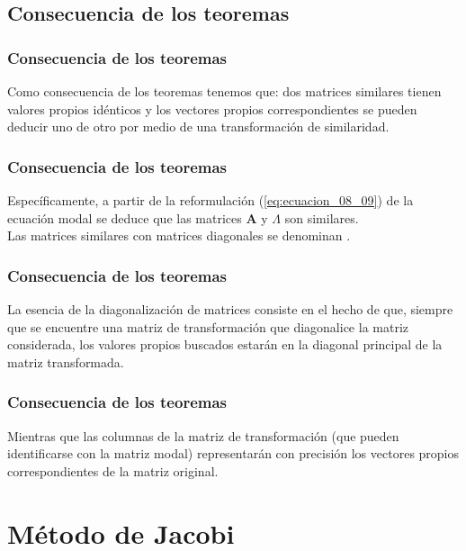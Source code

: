 \subsection*{Consecuencia de los teoremas}
\begin{frame}
\frametitle{Consecuencia de los teoremas}
Como consecuencia de los teoremas tenemos que: dos matrices similares tienen valores propios idénticos y los vectores propios correspondientes se pueden deducir uno de otro por medio de una transformación de similaridad.
\end{frame}
\begin{frame}
\frametitle{Consecuencia de los teoremas}
Específicamente, a partir de la reformulación (\ref{eq:ecuacion_08_09}) de la ecuación modal se deduce que las matrices $\mathbf{A}$ y $\Lambda$ son similares.
\\
\bigskip
\pause
Las matrices similares con matrices diagonales se denominan .
\end{frame}
\begin{frame}
\frametitle{Consecuencia de los teoremas}
La esencia de la diagonalización de matrices consiste en el hecho de que, siempre que se encuentre una matriz de transformación que diagonalice la matriz considerada, los valores propios buscados estarán en la diagonal principal de la matriz transformada.
\end{frame}
\begin{frame}
\frametitle{Consecuencia de los teoremas}
Mientras que las columnas de la matriz de transformación (que pueden identificarse con la matriz modal) representarán con precisión los vectores propios correspondientes de la matriz original.
\end{frame}
\section{Método de Jacobi}
